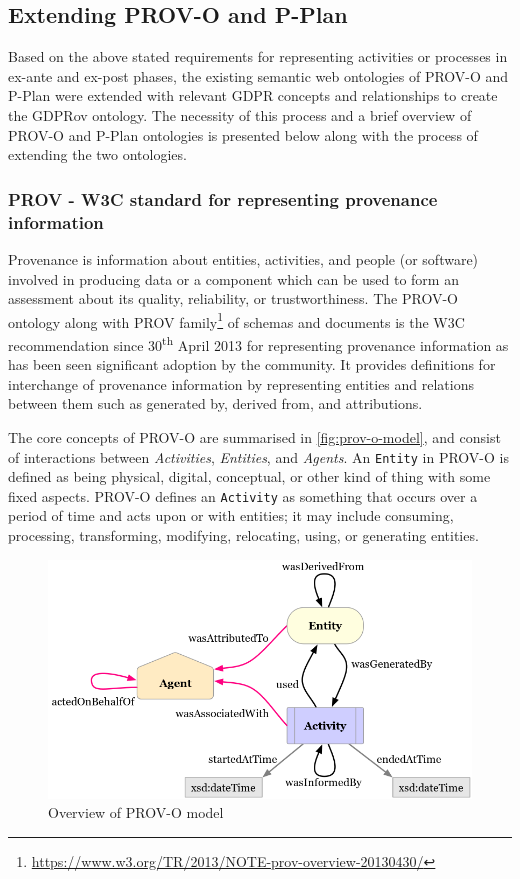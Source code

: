 \subsection{Extending PROV-O and P-Plan}
Based on the above stated requirements for representing activities or processes in ex-ante and ex-post phases, the existing semantic web ontologies of PROV-O \cite{lebo_prov-o_2013} and P-Plan \cite{garijo_p-plan_2014} were extended with relevant GDPR concepts and relationships to create the GDPRov ontology. The necessity of this process and a brief overview of PROV-O and P-Plan ontologies is presented below along with the process of extending the two ontologies.

\subsubsection{PROV - W3C standard for representing provenance information}
Provenance is information about entities, activities, and people (or software)
involved in producing data or a component which can be used to form an
assessment about its quality, reliability, or trustworthiness. The PROV-O ontology \cite{lebo_prov-o_2013} along with PROV family\footnote{\url{https://www.w3.org/TR/2013/NOTE-prov-overview-20130430/}} of schemas and documents is the W3C recommendation since 30\textsuperscript{th} April 2013 for representing provenance information as has been seen significant adoption by the community.
It provides definitions for interchange of provenance information by representing entities
and relations between them such as generated by, derived from, and attributions.

The core concepts of PROV-O are summarised in \autoref{fig:prov-o-model}, and consist of interactions between \textit{Activities}, \textit{Entities}, and \textit{Agents}.
An \texttt{Entity} in PROV-O is defined as being physical, digital, conceptual, or other
kind of thing with some fixed aspects. PROV-O defines an \texttt{Activity} as something
that occurs over a period of time and acts upon or with entities; it may include
consuming, processing, transforming, modifying, relocating, using, or generating
entities.
\begin{figure}[htbp]
    \centering
    \includegraphics[width=0.8\linewidth]{img/prov-o-model.png}
    \caption{Overview of PROV-O model \cite{lebo_prov-o_2013}}
    \label{fig:prov-o-model}
\end{figure}

